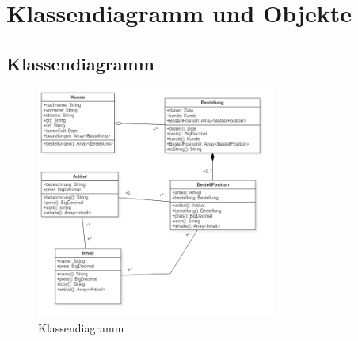 \documentclass{article}
\begin{document}
\section{Klassendiagramm und Objekte}
\subsection{Klassendiagramm}
\begin{figure}[h]
\begin{center}
\includegraphics[width=0.7\textwidth]{res/uml.png}
\caption{Klassendiagramm}
\label{klassendiagramm}
\end{center}
\end{figure}
\end{document}
